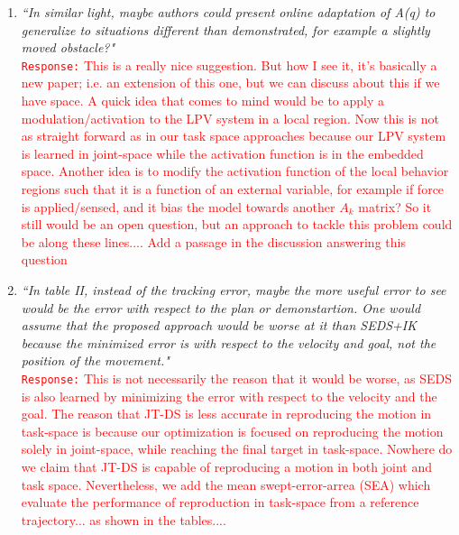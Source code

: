 \documentclass[10pt,stdletter,dateno]{newlfm}
\begin{document}
\begin{newlfm}
\begin{enumerate}
\item \textit{``In similar light, maybe authors could present online adaptation of
A(q) to generalize to situations different than demonstrated, for
example a slightly moved obstacle?"}\\
\textcolor{red}{\texttt{Response:} \small This is a really nice suggestion. But how I see it, it's basically a new paper; i.e. an extension of this one, but we can discuss about this if we have space. A quick idea that comes to mind would be to apply a modulation/activation to the LPV system in a local region. Now this is not as straight forward as in our task space approaches because our LPV system is learned in joint-space while the activation function is in the embedded space. Another idea is to modify the activation function of the local behavior regions such that it is a function of an external variable, for example if force is applied/sensed, and it bias the model towards another $A_k$ matrix? So it still would be an open question, but an approach to tackle this problem could be along these lines.... Add a passage in the discussion answering this question}\\

\item \textit{``In table II, instead of the tracking error, maybe the more useful
error to see would be the error with respect to the plan or
demonstartion. One would assume that the proposed approach would be
worse at it than SEDS+IK because the minimized error is with respect to
the velocity and goal, not the position of the movement."}\\
\textcolor{red}{\texttt{Response:} \small This is not necessarily the reason that it would be worse, as SEDS is also learned by minimizing the error with respect to
the velocity and the goal. The reason that JT-DS is less accurate in reproducing the motion in task-space is because our optimization is focused on reproducing the motion solely in joint-space, while reaching the final target in task-space. Nowhere do we claim that JT-DS is capable of reproducing a motion in both joint and task space. Nevertheless, we add the mean swept-error-arrea (SEA) which evaluate the performance of reproduction in task-space from a reference trajectory... as shown in the tables....}\\

\end{enumerate}


\end{newlfm}
\end{document}
